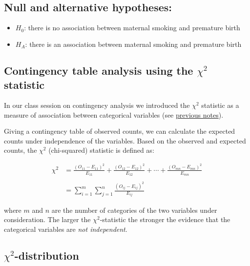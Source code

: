 \documentclass[]{book}
\providecommand{\tightlist}{%
  \setlength{\itemsep}{0pt}\setlength{\parskip}{0pt}}
\theoremstyle{definition}
\theoremstyle{definition}
\theoremstyle{definition}
\theoremstyle{remark}
\begin{document}
\hypertarget{null-and-alternative-hypotheses-3}{%
\subsection{Null and alternative
hypotheses:}\label{null-and-alternative-hypotheses-3}}

\begin{itemize}
\tightlist
\item
  \(H_0\): there is no association between maternal smoking and
  premature birth
\item
  \(H_A\): there is an association between maternal smoking and
  premature birth
\end{itemize}

\hypertarget{contingency-table-analysis-using-the-chi2-statistic}{%
\subsection{\texorpdfstring{Contingency table analysis using the
\(\chi^2\)
statistic}{Contingency table analysis using the \textbackslash{}chi\^{}2 statistic}}\label{contingency-table-analysis-using-the-chi2-statistic}}

In our class session on contingency analysis we introduced the
\(\chi^2\) statistic as a measure of association between categorical
variables (see
\href{https://github.com/bio304-class/bio304-course-notes/raw/master/slides/bivariate-association.pdf}{previous
notes}).

Giving a contingency table of observed counts, we can calculate the
expected counts under independence of the variables. Based on the
observed and expected counts, the \(\chi^2\) (chi-squared) statistic is
defined as:

\begin{align}
\chi^2 &= \frac{(O_{11} - E_{11})^2}{E_{11}} + \frac{(O_{12} - E_{12})^2}{E_{12}} + \cdots + \frac{(O_{mn} - E_{mn})^2}{E_{mn}} \\
\\
&= \sum_{i=1}^{m}\sum_{j=1}^{n} \frac{(O_{ij} - E_{ij})^2}{E_{ij}}
\end{align}

where \(m\) and \(n\) are the number of categories of the two variables
under consideration. The larger the \(\chi^2\)-statistic the stronger
the evidence that the categorical variables are \emph{not independent}.

\hypertarget{chi2-distribution}{%
\subsection{\texorpdfstring{\(\chi^2\)-distribution}{\textbackslash{}chi\^{}2-distribution}}\label{chi2-distribution}}
\end{document}
